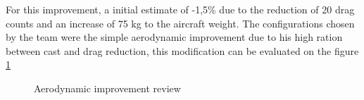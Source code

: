 For this improvement, a initial estimate of -1,5\% due to the reduction of 20 drag counts and an increase of 75 kg to the aircraft weight.
 The configurations chosen by the team were the simple aerodynamic improvement due to his high ration between cast and drag reduction, this modification can be evaluated on the figure \ref{fig:Aerodynamicimprovementreview}

\begin{figure}[H] %
\caption{Aerodynamic improvement review}
\label{fig:Aerodynamicimprovementreview}
\end{figure}







